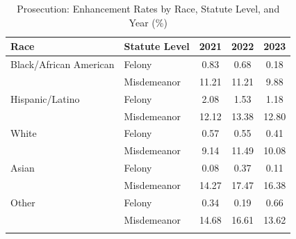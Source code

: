 
\begin{table}[H]
\centering
\caption{Prosecution: Enhancement Rates by Race, Statute Level, and Year (\%)}
\label{tab:prosecution}
\begin{tabular}{l l c c c}
\toprule
Race & Statute Level & 2021 & 2022 & 2023 \\
\midrule
Black/African American & Felony & 0.83 & 0.68 & 0.18 \\
 & Misdemeanor & 11.21 & 11.21 & 9.88 \\
\addlinespace
Hispanic/Latino & Felony & 2.08 & 1.53 & 1.18 \\
 & Misdemeanor & 12.12 & 13.38 & 12.80 \\
\addlinespace
White & Felony & 0.57 & 0.55 & 0.41 \\
 & Misdemeanor & 9.14 & 11.49 & 10.08 \\
Asian & Felony & 0.08 & 0.37 & 0.11 \\
 & Misdemeanor & 14.27 & 17.47 & 16.38 \\
\addlinespace
Other & Felony & 0.34 & 0.19 & 0.66 \\
 & Misdemeanor & 14.68 & 16.61 & 13.62 \\
\addlinespace
\bottomrule
\end{tabular}
\end{table}
